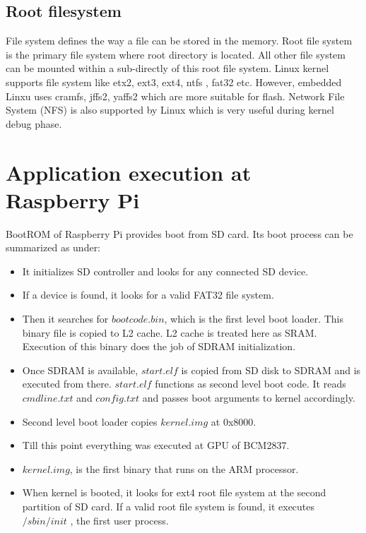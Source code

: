 \subsection {Root filesystem}
\indent File system defines the way a file can be stored in the memory.
Root file system is the primary file system where root directory is
located. All other file system can be mounted within a sub-directly of
this root file system. Linux kernel supports file system like etx2,
ext3, ext4, ntfs , fat32 etc. However, embedded Linxu uses cramfs,
jffs2, yaffs2 which are more suitable for flash. Network File System
(NFS) is also supported by Linux which is very useful during kernel
debug phase.
\section {Application execution at Raspberry Pi}
BootROM of Raspberry Pi provides boot from SD card. Its boot process can
be summarized as under:
\begin{itemize}
 \item It initializes SD controller and looks for any connected
 SD device.
 \item If a device is found, it looks for a valid FAT32 file
 system.
 \item Then it searches for $bootcode.bin$, which is the first
 level boot loader. This binary file is copied to L2
 cache. L2 cache is treated here as SRAM. Execution of
 this binary does the job of SDRAM initialization.
 \item Once SDRAM is available, $start.elf$ is copied from SD
 disk to SDRAM and is executed from there. $start.elf$
 functions as second level boot code. It reads
 $cmdline.txt$ and $config.txt$ and passes boot arguments to
 kernel accordingly.
 \item Second level boot loader copies $kernel.img$ at 0x8000.
 \item Till this point everything was executed at GPU of BCM2837.
 \item $kernel.img$, is the first binary that runs on the ARM
 processor.
 \item When kernel is booted, it looks for ext4 root file system at
 the second partition of SD card. If a valid root file
 system is found, it executes $/sbin/init$ , the first user
 process.
\end{itemize}
